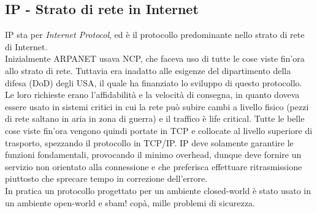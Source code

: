 \documentclass[10pt,a4paper,twoside]{article}
\begin{document}
\subsection{IP - Strato di rete in Internet}
IP sta per \textit{Internet Protocol}, ed è il protocollo predominante nello strato di rete di Internet.\\
Inizialmente ARPANET usava NCP, che faceva uso di tutte le cose viste fin'ora allo strato di rete. Tuttavia era inadatto alle esigenze del dipartimento della difesa (DoD) degli USA, il quale ha finanziato lo sviluppo di questo protocollo. Le loro richieste erano l'affidabilità e la velocità di consegna, in quanto doveva essere usato in sistemi critici in cui la rete può subire cambi a livello fisico (pezzi di rete saltano in aria in zona di guerra) e il traffico è life critical. Tutte le belle cose viste fin'ora vengono quindi portate in TCP e collocate al livello superiore di trasporto, spezzando il protocollo in TCP/IP. IP deve solamente garantire le funzioni fondamentali, provocando il minimo overhead, dunque deve fornire un servizio non orientato alla connessione e che preferisca effettuare ritrasmissione piuttosto che sprecare tempo in correzione dell'errore.\\
In pratica un protocollo progettato per un ambiente closed-world è stato usato in un ambiente open-world e sbam! copà, mille problemi di sicurezza.

\newpage
\end{document}
